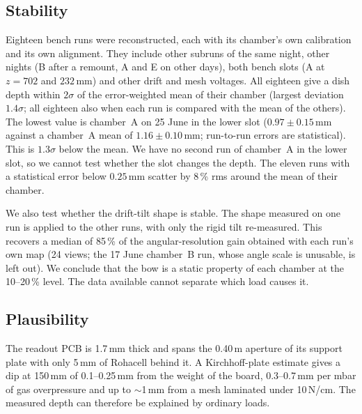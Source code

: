 \subsection{Stability}
Eighteen bench runs were reconstructed, each with its chamber's own calibration and its own alignment. They include
other subruns of the same night, other nights (B after a remount, A and E on other days), both bench slots (A at
$z=702$ and $232$\,mm) and other drift and mesh voltages. All eighteen give a dish depth within $2\sigma$ of the
error-weighted mean of their chamber (largest deviation $1.4\sigma$; all eighteen also when each run is compared with
the mean of the others). The lowest value is chamber~A on 25 June in the lower slot ($0.97\pm0.15$\,mm against a chamber~A mean
of $1.16\pm0.10$\,mm; run-to-run errors are statistical). This is $1.3\sigma$ below the mean. We have no second run of
chamber~A in the lower slot, so we cannot test whether the slot changes the depth. The eleven runs with a statistical
error below $0.25$\,mm scatter by 8\,\% rms around the mean of their chamber.

We also test whether the drift-tilt shape is stable. The shape measured on one run is applied to the other runs, with
only the rigid tilt re-measured. This recovers a median of 85\,\% of the angular-resolution gain obtained with each
run's own map (24 views; the 17 June chamber~B run, whose angle scale is unusable, is left
out). We conclude that the bow is a static property of each chamber at the 10--20\,\% level. The data available
cannot separate which load causes it.

\subsection{Plausibility}
The readout PCB is 1.7\,mm thick and spans the 0.40\,m aperture of its support plate with only 5\,mm of Rohacell
behind it. A Kirchhoff-plate estimate gives a dip at 150\,mm of 0.1--0.25\,mm from the weight of the board,
0.3--0.7\,mm per mbar of gas overpressure and up to $\sim$1\,mm from a mesh laminated under 10\,N/cm. The measured
depth can therefore be explained by ordinary loads.

